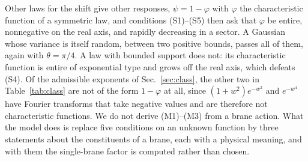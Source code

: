 \documentclass[a4paper,11pt]{article}
\begin{document}
Other laws for the shift give other responses, $\psi=1-\varphi$ with $\varphi$ the characteristic function of a symmetric law, and conditions (S1)--(S5) then ask that $\varphi$ be entire, nonnegative on the real axis, and rapidly decreasing in a sector. A Gaussian whose variance is itself random, between two positive bounds, passes all of them, again with $\theta=\pi/4$. A law with bounded support does not: its characteristic function is entire of exponential type and grows off the real axis, which defeats (S4). Of the admissible exponents of Sec.~\ref{sec:class}, the other two in Table~\ref{tab:class} are not of the form $1-\varphi$ at all, since $(1+w^2)e^{-w^2}$ and $e^{-w^4}$ have Fourier transforms that take negative values and are therefore not characteristic functions. We do not derive (M1)--(M3) from a brane action. What the model does is replace five conditions on an unknown function by three statements about the constituents of a brane, each with a physical meaning, and with them the single-brane factor is computed rather than chosen.
\end{document}
